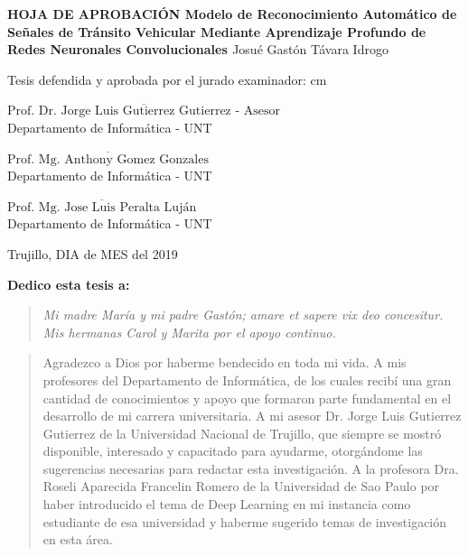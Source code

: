 \begin{center}
 {\bf {\Large HOJA DE APROBACIÓN }     
 \vskip 1.5cm
  {\Large Modelo de Reconocimiento Automático de Señales de Tránsito Vehicular Mediante Aprendizaje Profundo de Redes Neuronales Convolucionales }}
 \vskip 1cm 
  {\large{Josué Gastón Távara Idrogo}}\\

 \vskip 1cm
\end{center} 
Tesis defendida y aprobada por el jurado examinador:
 cm
\begin{flushleft} 
$\overline{\mbox{Prof. Dr. Jorge Luis Gutierrez Gutierrez - Asesor}}$\\
\vskip -0.5cm
Departamento de Informática - UNT
\end{flushleft} 
\vskip 1cm
\begin{flushleft} 
$\overline{\mbox{Prof. Mg. Anthony Gomez Gonzales}}$\\
\vskip -0.5cm
Departamento de Informática - UNT
\end{flushleft} 
\vskip 1cm
\begin{flushleft} 
$\overline{\mbox{Prof. Mg. Jose Luis Peralta Luján}}$\\
\vskip -0.5cm
Departamento de Informática - UNT
\end{flushleft}
\vskip 0.5cm 
\begin{center}    
Trujillo, DIA de MES del 2019
\end{center} 
\newpage


 
 {\bf\Large {Dedico esta tesis a:}}
 \vskip 1cm
  \begin{quotation}
  {\it Mi madre María y mi padre Gastón; amare et sapere vix deo concesitur.
    \vskip 1cm
    Mis hermanas Carol y Marita por el apoyo continuo.
  }
 \end{quotation}


  \newpage
  {\bf\Large {}}
  \vskip 1.5cm
  \begin{quotation}
  Agradezco a Dios por haberme bendecido en toda mi vida.
  \vskip 1cm
  A mis profesores del Departamento de Informática, de los cuales recibí una gran cantidad de conocimientos y apoyo que formaron parte fundamental en el desarrollo de mi carrera universitaria.
  \vskip 1cm
  A mi asesor Dr. Jorge Luis Gutierrez Gutierrez de la Universidad Nacional de Trujillo, que siempre se mostró disponible, interesado y capacitado para ayudarme, otorgándome las sugerencias necesarias para redactar esta investigación.
  \vskip 1cm
  A la profesora Dra. Roseli Aparecida Francelin Romero de la Universidad de Sao Paulo por haber introducido el tema de Deep Learning en mi instancia como estudiante de esa universidad y haberme sugerido temas de investigación en esta área.

  \vskip 1cm
  \end{quotation}


